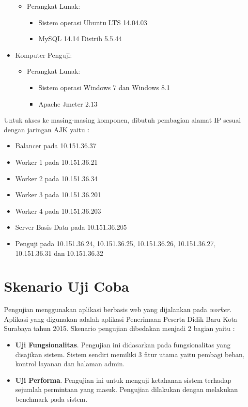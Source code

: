 \documentclass{ta-its}
\begin{document}
\begin{itemize}
\begin{itemize}
\begin{itemize}
					\end{itemize}
					\item Perangkat Lunak:
					\begin{itemize}
						\item Sistem operasi Ubuntu LTS 14.04.03
						\item MySQL 14.14 Distrib 5.5.44
					\end{itemize}
				\end{itemize}
				\item Komputer Penguji:
				\begin{itemize}
					\item Perangkat Lunak:
					\begin{itemize}
						\item Sistem operasi Windows 7 dan Windows 8.1
						\item Apache Jmeter 2.13
					\end{itemize}
				\end{itemize}
				
			\end{itemize}
			
			Untuk akses ke masing-masing komponen, dibutuh pembagian alamat IP sesuai dengan jaringan AJK yaitu :
			
			\begin{itemize}
				\item Balancer pada 10.151.36.37
				\item Worker 1 pada 10.151.36.21
				\item Worker 2 pada 10.151.36.34
				\item Worker 3 pada 10.151.36.201
				\item Worker 4 pada 10.151.36.203
				\item Server Basis Data pada 10.151.36.205
				\item Penguji pada 10.151.36.24, 10.151.36.25, 10.151.36.26, 10.151.36.27,
				10.151.36.31 dan 10.151.36.32
			\end{itemize}
			
		\section{Skenario Uji Coba}
			Pengujian menggunakan aplikasi berbasis web yang dijalankan pada \textit{worker}. Aplikasi yang digunakan adalah aplikasi Penerimaan Peserta Didik Baru Kota Surabaya tahun 2015. Skenario pengujian dibedakan menjadi 2 bagian yaitu :
			\begin{itemize}
				\item \textbf{Uji Fungsionalitas}. Pengujian ini didasarkan pada fungsionalitas yang disajikan sistem. Sistem sendiri memiliki 3 fitur utama yaitu pembagi beban, kontrol layanan dan halaman admin.
				\item \textbf{Uji Performa}. Pengujian ini untuk menguji ketahanan sistem terhadap sejumlah permintaan yang masuk. Pengujian dilakukan dengan melakukan benchmark pada sistem.
			\end{itemize}
			
\end{document}
